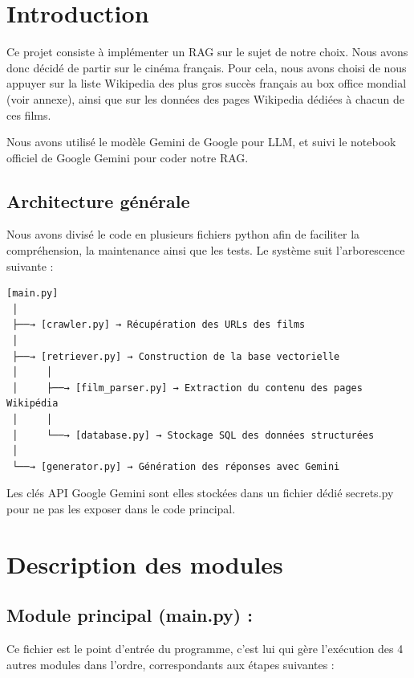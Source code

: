 \documentclass[11pt]{report}
\begin{document}
    \chapter{Introduction}
 
    Ce projet consiste à implémenter un RAG sur le sujet de notre choix. Nous avons donc décidé de
    partir sur le cinéma français. Pour cela, nous avons choisi de nous appuyer sur la liste Wikipedia des
    plus gros succès français au box office mondial (voir annexe), ainsi que sur les données des pages
    Wikipedia dédiées à chacun de ces films.
 
    Nous avons utilisé le modèle Gemini de Google pour LLM, et suivi le notebook officiel de Google
    Gemini pour coder notre RAG.
 
    \section{Architecture générale}
 
    Nous avons divisé le code en plusieurs fichiers python afin de faciliter la compréhension, la
    maintenance ainsi que les tests. Le système suit l'arborescence suivante :
 
    \begin{verbatim}
[main.py]
 │
 ├──→ [crawler.py] → Récupération des URLs des films
 │
 ├──→ [retriever.py] → Construction de la base vectorielle
 │     │
 │     ├──→ [film_parser.py] → Extraction du contenu des pages Wikipédia
 │     │
 │     └──→ [database.py] → Stockage SQL des données structurées
 │
 └──→ [generator.py] → Génération des réponses avec Gemini
    \end{verbatim}
 
    Les clés API Google Gemini sont elles stockées dans un fichier dédié secrets.py pour ne pas les
    exposer dans le code principal.

    
    \chapter{Description des modules}
 
    \section{Module principal (main.py) :}
 
    Ce fichier est le point d'entrée du programme, c'est lui qui gère l'exécution des 4 autres
    modules dans l'ordre, correspondants aux étapes suivantes :
 
\end{document}
